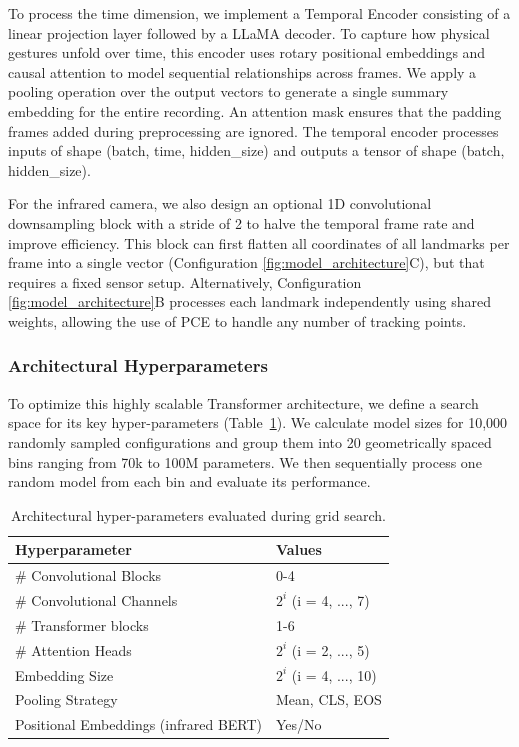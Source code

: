 \documentclass{article}
\begin{document}
To process the time dimension, we implement a Temporal Encoder consisting of a linear projection layer followed by a LLaMA \cite{touvron2023llama} decoder. To capture how physical gestures unfold over time, this encoder uses rotary positional embeddings and causal attention to model sequential relationships across frames. We apply a pooling operation over the output vectors to generate a single summary embedding for the entire recording. An attention mask ensures that the padding frames added during preprocessing are ignored. The temporal encoder processes inputs of shape (batch, time, hidden\_size) and outputs a tensor of shape (batch, hidden\_size).

For the infrared camera, we also design an optional 1D convolutional downsampling block with a stride of 2 to halve the temporal frame rate and improve efficiency. This block can first flatten all coordinates of all landmarks per frame into a single vector (Configuration \ref{fig:model_architecture}C), but that requires a fixed sensor setup. Alternatively, Configuration \ref{fig:model_architecture}B processes each landmark independently using shared weights, allowing the use of PCE to handle any number of tracking points.

\subsubsection{Architectural Hyperparameters}

To optimize this highly scalable Transformer architecture, we define a search space for its key hyper-parameters (Table~\ref{tab:architectural}). We calculate model sizes for 10,000 randomly sampled configurations and group them into 20 geometrically spaced bins ranging from 70k to 100M parameters. We then sequentially process one random model from each bin and evaluate its performance.

\begin{table}[!t]
\centering
\small
\begin{tabular}{p{5.2cm} p{2.2cm}}
\toprule
\textbf{Hyperparameter} & \textbf{Values} \\
\midrule
\# Convolutional Blocks & 0-4 \\
\# Convolutional Channels & $2^i$ (i = 4, ..., 7) \\
\hline
\# Transformer blocks & 1-6 \\
\# Attention Heads & $2^i$ (i = 2, ..., 5) \\
Embedding Size & $2^i$ (i = 4, ..., 10) \\
Pooling Strategy & Mean, CLS, EOS \\
Positional Embeddings (infrared BERT) & Yes/No \\
\bottomrule
\end{tabular}
\caption{Architectural hyper-parameters evaluated during grid search.}
\label{tab:architectural}
\end{table}
\end{document}
